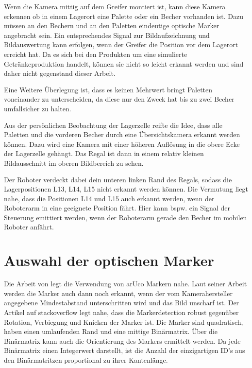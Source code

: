     Wenn die Kamera mittig auf dem Greifer montiert ist, kann diese Kamera erkennen ob in einem Lagerort eine Palette oder ein Becher vorhanden ist. 
    Dazu müssen an den Bechern und an den Paletten eindeutige optische Marker angebracht sein. 
    Ein entsprechendes Signal zur Bildaufzeichnung und Bildauswertung kann erfolgen, wenn der Greifer die Position vor dem Lagerort erreicht hat. 
    Da es sich bei den Produkten um eine simulierte Getränkeproduktion handelt, können sie nicht so leicht erkannt werden und sind daher nicht gegenstand dieser Arbeit. 
    
    Eine Weitere Überlegung ist, dass es keinen Mehrwert bringt Paletten voneinander zu unterscheiden, da diese nur den Zweck hat bis zu zwei Becher umfallsicher zu halten. 

    Aus der persönlichen Beobachtung der Lagerzelle reifte die Idee, dass alle Paletten und die vorderen Becher durch eine Übersichtskamera erkannt werden können. 
    Dazu wird eine Kamera mit einer höheren Auflösung in die obere Ecke der Lagerzelle gehängt. Das Regal ist dann in einem relativ kleinen Bildausschnitt im oberen Bildbereich zu sehen. 

    Der Roboter verdeckt dabei dein unteren linken Rand des Regals, sodass die Lagerpositionen L13, L14, L15 nicht erkannt werden können. 
    Die Vermutung liegt nahe, dass die Positionen L14 und L15 auch erkannt werden, wenn der Roboterarm in eine geeignete Position fährt. 
    Hier kann bspw. ein Signal der Steuerung emittiert werden, wenn der Roboterarm gerade den Becher im mobilen Roboter anfährt. 

    
    \section {Auswahl der optischen Marker}

    Die Arbeit von \cite{Hübler2019} legt die Verwendung von arUco Markern nahe. 
    Laut seiner Arbeit werden die Marker auch dann noch erkannt, wenn der vom Kamerahersteller angegebene Mindestabstand unterschritten wird und das Bild unscharf ist. 
    Der Artikel auf stackoverflow legt nahe, dass die Markerdetection robust gegenüber Rotation, Verbiegung und Knicken der Marker ist. 
    Die Marker sind quadratisch, haben einen umlaufenden Rand und eine mittige Binärmatrix. 
    Über die Binärmatrix kann auch die Orientierung des Markers ermittelt werden.
    Da jede Binärmatrix einen Integerwert darstellt, ist die Anzahl der einzigartigen ID's aus den Binärmatritzen proportional zu ihrer Kantenlänge.
    
